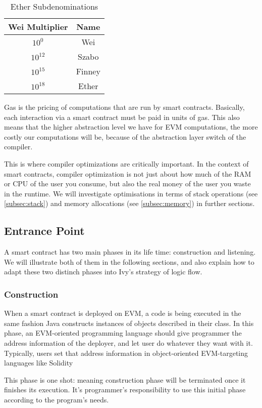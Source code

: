 \documentclass{article}
\begin{document}
\begin{table}[h]
  \centering
  \begin{tabular}{|c|c|}
    \hline
    \textbf{Wei Multiplier} & \textbf{Name} \\
    \hline
    $ 10^0 $ & Wei \\
    \hline
    $ 10^12 $ & Szabo \\
    \hline
    $ 10^15 $ & Finney \\
    \hline
    $ 10^18 $ & Ether \\
    \hline
  \end{tabular}
  \caption{Ether Subdenominations}
  \label{tab:ether_subdenominations}
\end{table}
\par Gas is the pricing of computations that are run by smart contracts. Basically, each interaction via a smart contract must be paid in units of gas. This also means that the higher abstraction level we have for EVM computations, the more costly our computations will be, because of the abstraction layer switch of the compiler.
\newpage
\par This is where compiler optimizations are critically important. In the context of smart contracts, compiler optimization is not just about how much of the RAM or CPU of the user you consume, but also the real money of the user you waste in the runtime. We will investigate optimisations in terms of stack operations (see \ref{subsec:stack}) and memory allocations (see \ref{subsec:memory}) in further sections.

\subsection{Entrance Point}
\par A smart contract has two main phases in its life time: construction and listening. We will illustrate both of them in the following sections, and also explain how to adapt these two distinch phases into Ivy's strategy of logic flow.
\subsubsection{Construction}
\label{subsubsec:construction}
\par When a smart contract is deployed on EVM, a code is being executed in the same fashion Java\cite{java} constructs instances of objects described in their class. In this phase, an EVM-oriented programming language should give programmer the address information of the deployer, and let user do whatever they want with it. Typically, users set that address information in object-oriented EVM-targeting languages like Solidity\cite{solidity}
\par This phase is one shot: meaning construction phase will be terminated once it finishes its execution. It's programmer's responsibility to use this initial phase according to the program's needs.
\end{document}
